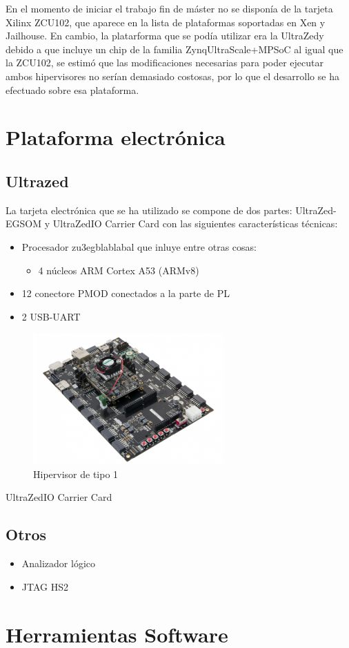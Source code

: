En el momento de iniciar el trabajo fin de máster no se disponía de la tarjeta Xilinx ZCU102, que aparece en la lista de plataformas soportadas en Xen y Jailhouse. En cambio, la platarforma que se podía utilizar era la UltraZed\texttrademark y debido a que incluye un chip de la familia Zynq\textregistered UltraScale+\texttrademark MPSoC al igual que la ZCU102, se estimó que las modificaciones necesarias para poder ejecutar ambos hipervisores no serían demasiado costosas, por lo que el desarrollo se ha efectuado sobre esa plataforma.

\section{Plataforma electrónica}
\subsection{Ultrazed}
La tarjeta electrónica que se ha utilizado se compone de dos partes: UltraZed-EG\texttrademark SOM y UltraZed\texttrademark IO Carrier Card con las siguientes características técnicas:
\begin{itemize}
  \item Procesador zu3egblablabal que inluye entre otras cosas:
  \begin{itemize}
    \item 4 núcleos ARM Cortex A53 (ARMv8)
  \end{itemize}
  \item 12 conectore PMOD conectados a la parte de PL
  \item 2 USB-UART
\end{itemize}

\begin{figure}[h]
	\centering
	\includegraphics[width=0.65\textwidth]{recursos/ultrazed-eg-carrier.png}
	\caption{Hipervisor de tipo 1}
	\label{fig:ultrazed-eg-carrier}
\end{figure}

UltraZed\texttrademark IO Carrier Card

\subsection{Otros}

\begin{itemize}
  \item Analizador lógico
  \item JTAG HS2
\end{itemize}

\section{Herramientas Software}
